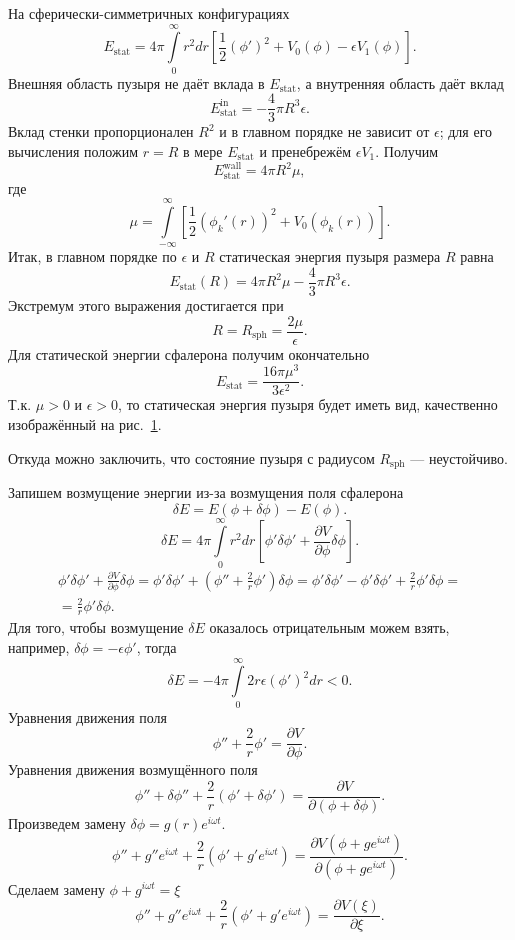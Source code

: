 \documentclass[a4paper]{article}
\begin{document}
\begin{sol}
На сферически-симметричных конфигурациях
\[
E_\text{stat}=4\pi \int\limits_{0}^{\infty} r^2 dr \left[ 
\frac{1}{2}(\phi')^2+V_0(\phi)-\epsilon V_1 (\phi)\right]  
.\] 
Внешняя область пузыря не даёт вклада в $E_\text{stat}$, а внутренняя
область даёт вклад
\[
E_{\text{stat}}^\text{in}=-\frac{4}{3}\pi R^3 \epsilon
.\] 
Вклад стенки пропорционален $R^2$ и в главном порядке не зависит
от  $\epsilon$; для его вычисления положим $r=R$ в мере $E_\text{stat}
$ и пренебрежём $\epsilon V_1$. Получим
\[
	E_\text{stat}^\text{wall}=4\pi R^2 \mu
,\] 
где
\[
\mu= \int\limits_{-\infty}^{\infty} \left[ 
\frac{1}{2}(\phi_k'(r))^2+V_0 (\phi_k(r))\right]  
.\] 
Итак, в главном порядке по $\epsilon$ и $R$ статическая энергия
пузыря
размера $R$ равна
\[
	E_{\text{stat}}(R)=4\pi R^2 \mu-\frac{4}{3}\pi R^3 \epsilon 
.\] 
Экстремум этого выражения достигается при
\[
R=R_\text{sph}= \frac{2\mu}{\epsilon}
.\] 
Для статической энергии сфалерона получим окончательно
\[
E_{\text{stat} }=\frac{16\pi \mu^3}{3\epsilon^2}
.\] 
Т.\:к. $\mu>0$ и $\epsilon>0$, то статическая энергия пузыря
будет  иметь вид, качественно изображённый на рис.~\ref{fig:1}.
\begin{figure}[ht]
    \centering
    \caption{}
    \label{fig:1}
\end{figure}
Откуда можно заключить, что состояние пузыря с радиусом $R_\text{sph}$ --- неустойчиво.

Запишем возмущение энергии из-за возмущения поля сфалерона
\[
	\delta E= E(\phi+\delta \phi)-E(\phi)
.\] 
\[
\delta E= 4\pi \int\limits_{0}^{\infty} r^2 dr
\left[ \phi' \delta\phi'+\frac{\partial V}{\partial \phi}  \delta \phi\right] 
.\] 
\begin{multline*}
\phi' \delta \phi'+ \frac{\partial V}{\partial \phi} \delta \phi=
\phi'\delta \phi'+ \left(\phi''+ \frac{2}{r}\phi'\right)\delta\phi
=\phi'\delta \phi'-\phi' \delta \phi'+\frac{2}{r}\phi'\delta\phi=
\\=\frac{2}{r}\phi'\delta \phi
.\end{multline*} 
Для того, чтобы возмущение $\delta E$ оказалось отрицательным
можем взять, например, $\delta \phi=-\epsilon \phi'$, тогда
\[
	\delta E= -4 \pi \int\limits_{0}^{\infty} 2r\epsilon(\phi')^2 dr <0
.\] 
Уравнения движения поля
\[
\phi''+ \frac{2}{r} \phi'= \frac{\partial V}{\partial \phi} 
.\] 
Уравнения движения возмущённого поля
\[
	\phi''+\delta\phi''+ \frac{2}{r} (\phi'+\delta \phi')=
	\frac{\partial V}{\partial (\phi+\delta \phi)} 
.\] 
Произведем замену $\delta \phi=g(r) e^{i \omega t}$.
\[
	\phi''+g'' e^{i\omega t}+ \frac{2}{r}(\phi'+
	g' e^{i\omega t})= \frac{\partial V(\phi+g e^{i\omega t})}{\partial (\phi+
	g e^{i\omega t})} 
.\] 
Сделаем замену $\phi+g ^{i\omega t}=\xi$
\[
	\phi''+g'' e^{i\omega t}+ \frac{2}{r}(\phi'+
	g' e^{i\omega t})= \frac{\partial V(\xi)}{\partial \xi}
.\]


\end{sol}
\end{document}

